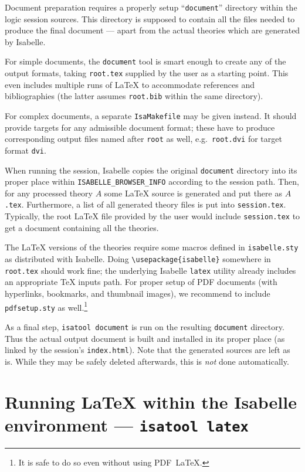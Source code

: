\medskip Document preparation requires a properly setup ``\texttt{document}''
directory within the logic session sources.  This directory is supposed to
contain all the files needed to produce the final document --- apart from the
actual theories which are generated by Isabelle.

\medskip For simple documents, the \texttt{document} tool is smart enough to
create any of the output formats, taking \texttt{root.tex} supplied by the
user as a starting point.  This even includes multiple runs of {\LaTeX} to
accommodate references and bibliographies (the latter assumes
\texttt{root.bib} within the same directory).

For complex documents, a separate \texttt{IsaMakefile} may be given instead.
It should provide targets for any admissible document format; these have to
produce corresponding output files named after \texttt{root} as well, e.g.\ 
\texttt{root.dvi} for target format \texttt{dvi}.

\medskip When running the session, Isabelle copies the original
\texttt{document} directory into its proper place within
\texttt{ISABELLE_BROWSER_INFO} according to the session path.  Then, for any
processed theory $A$ some {\LaTeX} source is generated and put there as
$A$\texttt{.tex}.  Furthermore, a list of all generated theory files is put
into \texttt{session.tex}.  Typically, the root {\LaTeX} file provided by the
user would include \texttt{session.tex} to get a document containing all the
theories.

The {\LaTeX} versions of the theories require some macros defined in
\texttt{isabelle.sty} as distributed with Isabelle.  Doing
\verb,\usepackage{isabelle}, somewhere in \texttt{root.tex} should work fine;
the underlying Isabelle \texttt{latex} utility already includes an appropriate
{\TeX} inputs path.  For proper setup of PDF documents (with hyperlinks,
bookmarks, and thumbnail images), we recommend to include \verb,pdfsetup.sty,
as well.\footnote{It is safe to do so even without using PDF~\LaTeX.}

\medskip As a final step, \texttt{isatool document} is run on the resulting
\texttt{document} directory.  Thus the actual output document is built and
installed in its proper place (as linked by the session's
\texttt{index.html}).  Note that the generated sources are left as is.  While
they may be safely deleted afterwards, this is \emph{not} done automatically.


\section{Running {\LaTeX} within the Isabelle environment --- \texttt{isatool latex}}
\label{sec:tool-latex}

